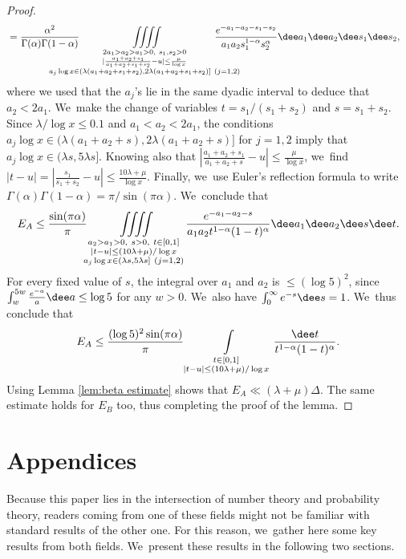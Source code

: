 \begin{proof}
\[\begin{split}
&= \frac{\alpha^2}{\Gamma(\alpha)\Gamma(1-\alpha)} \mkern-50mu \iiiint\limits_{
\substack{
2a_1>a_2>a_1>0,\ s_1,s_2>0 \\
| \frac{a_1+a_2+s_1}{a_1+a_2+s_1+s_2} - u |\le \frac{\mu}{\log x} \\
a_j\log x \in (\lambda (a_1+a_2+s_1+s_2),2\lambda (a_1+a_2+s_1+s_2)] \ (j=1,2)
} }
\mkern-50mu\frac{e^{-a_1-a_2-s_1-s_2}}
{a_1a_2s_1^{1-\alpha}s_2^\alpha}\dee a_1\dee a_2 \dee s_1\dee s_2,
\end{split}
\]
where we used that the $a_j$'s lie in the same dyadic interval to deduce that $a_2<2a_1$. We~make the change of variables $t=s_1/(s_1+s_2)$ and $s=s_1+s_2$. Since $\lambda/\log x\le 0.1$ and $a_1<a_2<2a_1$, the conditions $a_j\log x \in (\lambda (a_1+a_2+s),2\lambda (a_1+a_2+s)]$ for $j=1,2$ imply that $a_j\log x \in(\lambda s,5\lambda s]$. Knowing also that $ |\frac{a_1+a_2+s_1}{a_1+a_2+s} - u |\le \frac{\mu}{\log x}$, we~find $|t-u|=|\frac{s_1}{s_1+s_2} - u|\le \frac{10\lambda+\mu}{\log x}$. Finally, we~use Euler's reflection formula to write $\Gamma(\alpha)\Gamma(1-\alpha)=\pi/\sin(\pi\alpha)$. We~conclude that
\[
E_A \le \frac{\sin(\pi \alpha)}{\pi}
\iiiint\limits_{
\substack{
a_2>a_1>0,\ s>0,\ t\in[0,1] \\
| t-u|\le (10\lambda+\mu)/\log x\\
a_j\log x \in (\lambda s, 5\lambda s] \ (j=1,2)
} }
\frac{e^{-a_1-a_2-s}}
{a_1a_2t^{1-\alpha}(1-t)^\alpha}\dee a_1\dee a_2 \dee s\dee t.
\]
For every fixed value of $s$, the integral over $a_1$ and $a_2$ is $\le(\log 5)^2$, since $\int_w^{5w}\frac{e^{-a}}{a}\dee a \le \log5$ for any $w>0$. We~also have $\int_0^\infty e^{-s}\dee s=1$. We~thus conclude that
\[
E_A\le \frac{(\log 5)^2\sin(\pi \alpha) }{\pi} \int\limits_{\substack{t\in[0,1] \\ |t-u|\le (10\lambda+\mu)/\log x}} \frac{\dee t}{t^{1-\alpha}(1-t)^\alpha}.
\]
Using Lemma \ref{lem:beta estimate} shows that $E_A\ll (\lambda+\mu)\Delta$. The same estimate holds for $E_B$ too, thus completing the proof of the lemma.
\end{proof}

\part{Appendices}
\appendix

Because this paper lies in the intersection of number theory and probability theory, readers coming from one of these fields might not be familiar with standard results of the other one. For this reason, we~gather here some key results from both fields. We~present these results in the following two sections.

